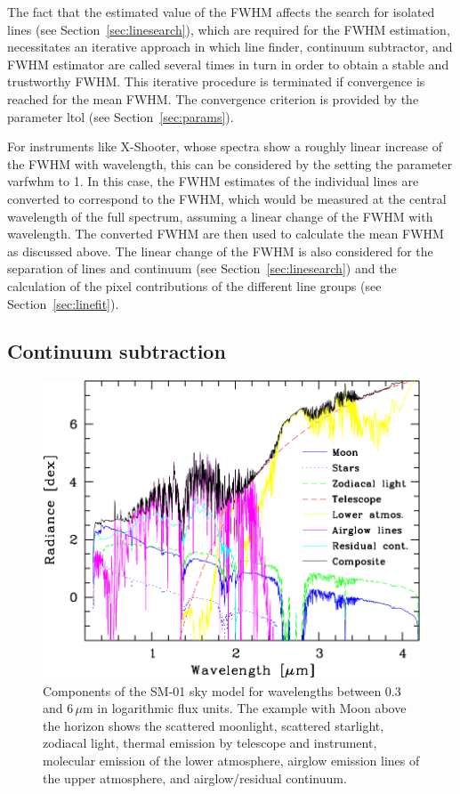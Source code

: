 The fact that the estimated value of the FWHM affects the search for isolated
lines (see Section~\ref{sec:linesearch}), which are required for the FWHM
estimation, necessitates an iterative approach in which line finder, continuum
subtractor, and FWHM estimator are called several times in turn in order to
obtain a stable and trustworthy FWHM. This iterative procedure is terminated if
convergence is reached for the mean FWHM. The convergence criterion is
provided by the parameter {\sc ltol} (see Section~\ref{sec:params}).

For instruments like X-Shooter, whose spectra show a roughly linear increase of
the FWHM with wavelength, this can be considered by the setting the parameter
{\sc varfwhm} to 1. In this case, the FWHM estimates of the individual lines
are converted to correspond to the FWHM, which would be measured at the
central wavelength of the full spectrum, assuming a linear change of the
FWHM with wavelength. The converted FWHM are then used to calculate the mean
FWHM as discussed above. The linear change of the FWHM is also considered for
the separation of lines and continuum (see Section~\ref{sec:linesearch}) and
the calculation of the pixel contributions of the different line groups
(see Section~\ref{sec:linefit}).

\subsection{Continuum subtraction}\label{sec:contsub}
\begin{figure}
\centering
\includegraphics[width=12cm,clip=true]{figures/smd2_logcomp.pdf}
\caption[]{Components of the SM-01 sky model for wavelengths between $0.3$ and
6\,$\mu$m in logarithmic flux units. The example with Moon above the horizon
shows the scattered moonlight, scattered starlight, zodiacal light, thermal
emission by telescope and instrument, molecular emission of the lower
atmosphere, airglow emission lines of the upper atmosphere, and
airglow/residual continuum.}
\label{fig:logcomp}
\end{figure}

